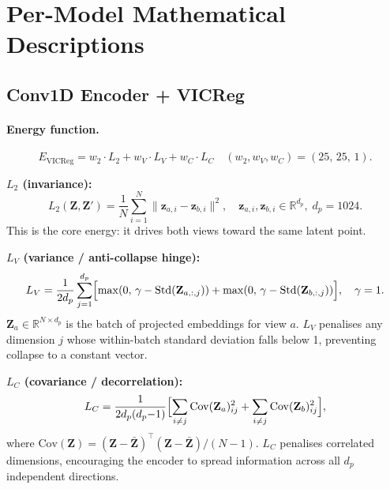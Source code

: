 \documentclass[11pt,a4paper]{article}
\begin{document}
\section{Per-Model Mathematical Descriptions}
\label{sec:math}

\subsection{Conv1D Encoder + VICReg}
\label{sec:math_conv}

\paragraph{Energy function.}
\begin{equation}
  \boxed{E_{\mathrm{VICReg}} = w_2 \cdot L_2 + w_V \cdot L_V + w_C \cdot L_C}
  \quad (w_2, w_V, w_C) = (25,\,25,\,1).
\end{equation}

\textbf{$L_2$ (invariance):}
\begin{equation}
  L_2(\mathbf{Z}, \mathbf{Z}') = \frac{1}{N}\sum_{i=1}^{N}\|\mathbf{z}_{a,i} - \mathbf{z}_{b,i}\|^2,
  \quad \mathbf{z}_{a,i}, \mathbf{z}_{b,i} \in \mathbb{R}^{d_p},\; d_p{=}1024.
\end{equation}
This is the core energy: it drives both views toward the same latent point.

\textbf{$L_V$ (variance / anti-collapse hinge):}
\begin{equation}
  L_V = \frac{1}{2d_p}\sum_{j=1}^{d_p}\Bigl[
    \max(0,\,\gamma - \mathrm{Std}(\mathbf{Z}_{a,:,j})) +
    \max(0,\,\gamma - \mathrm{Std}(\mathbf{Z}_{b,:,j}))
  \Bigr], \quad \gamma = 1.
\end{equation}
$\mathbf{Z}_a \in \mathbb{R}^{N \times d_p}$ is the batch of projected embeddings for view $a$.
$L_V$ penalises any dimension $j$ whose within-batch standard deviation falls below 1,
preventing collapse to a constant vector.

\textbf{$L_C$ (covariance / decorrelation):}
\begin{equation}
  L_C = \frac{1}{2d_p(d_p{-}1)}\Bigl[
    \sum_{i\neq j}\mathrm{Cov}(\mathbf{Z}_a)^2_{ij} +
    \sum_{i\neq j}\mathrm{Cov}(\mathbf{Z}_b)^2_{ij}
  \Bigr],
\end{equation}
where $\mathrm{Cov}(\mathbf{Z}) = (\mathbf{Z}-\bar{\mathbf{Z}})^\top(\mathbf{Z}-\bar{\mathbf{Z}})/(N-1)$.
$L_C$ penalises correlated dimensions, encouraging the encoder to spread information
across all $d_p$ independent directions.
\end{document}
